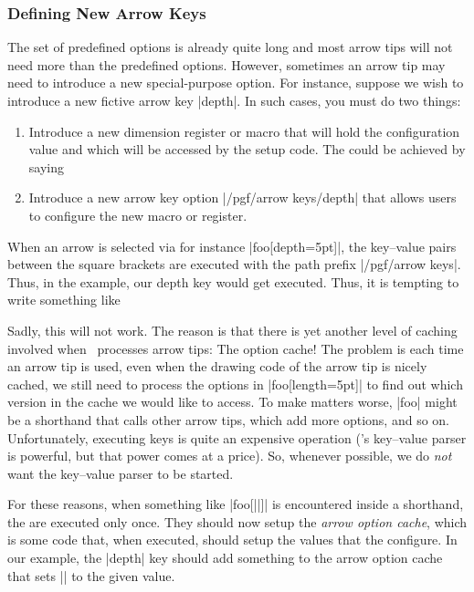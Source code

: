 \subsubsection{Defining New Arrow Keys}
\label{section-arrow-option-cache}

The set of predefined options is already quite long and most arrow tips will
not need more than the predefined options. However, sometimes an arrow tip may
need to introduce a new special-purpose option. For instance, suppose we wish
to introduce a new fictive arrow key |depth|. In such cases, you must do two
things:
%
\begin{enumerate}
    \item Introduce a new dimension register or macro that will hold the
        configuration value and which will be accessed by the setup code. The
        could be achieved by saying
\begin{codeexample}
\newdimen\pgfarrowdepth
\end{codeexample}
    \item Introduce a new arrow key option |/pgf/arrow keys/depth| that allows
        users to configure the new macro or register.
\end{enumerate}

When an arrow is selected via for instance |foo[depth=5pt]|, the key--value
pairs between the square brackets are executed with the path prefix
|/pgf/arrow keys|. Thus, in the example, our depth key would get executed.
Thus, it is tempting to write something like
%
\begin{codeexample}
\end{codeexample}

Sadly, this will not work. The reason is that there is yet another level of
caching involved when \pgfname\ processes arrow tips: The option cache! The
problem is each time an arrow tip is used, even when the drawing code of the
arrow tip is nicely cached, we still need to process the options in
|foo[length=5pt]| to find out which version in the cache we would like to
access. To make matters worse, |foo| might be a shorthand that calls other
arrow tips, which add more options, and so on. Unfortunately, executing keys is
quite an expensive operation (\pgfname's key--value parser is powerful, but
that power comes at a price). So, whenever possible, we do \emph{not} want the
key--value parser to be started.

For these reasons, when something like |foo[||]| is encountered
inside a shorthand, the  are executed only once. They should now
setup the \emph{arrow option cache}, which is some code that, when executed,
should setup the values that the  configure. In our example, the
|depth| key should add something to the arrow option cache that sets
|\pgfarrowdepth| to the given value.

